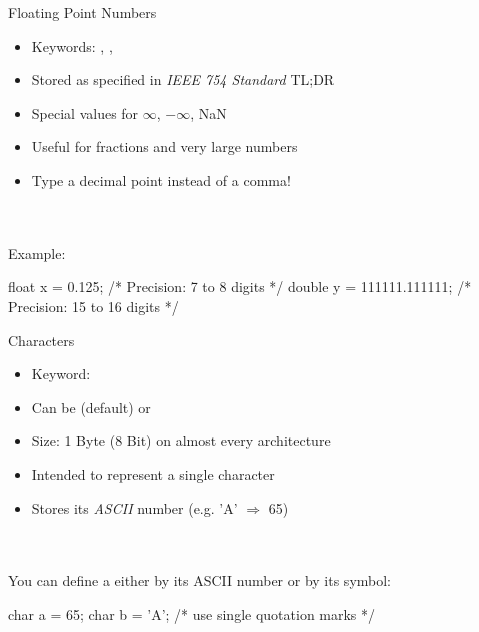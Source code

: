 \documentclass[10pt,graphics,aspectratio=169,table]{beamer}
\begin{document}
\begin{frame}[fragile]{Floating Point Numbers}
    \begin{itemize}
        \item Keywords: , , 
        \item Stored as specified in \textit{IEEE 754 Standard} TL;DR
        \item Special values for $\infty$, $-\infty$, NaN
        \item Useful for fractions and very large numbers
        \item Type a decimal point instead of a comma!
    \end{itemize}\ \\
    \ \\
    Example:
    \begin{codeblock}
float x = 0.125;             /* Precision: 7 to 8 digits */
double y = 111111.111111;    /* Precision: 15 to 16 digits */
    \end{codeblock}
\end{frame}
\begin{frame}[fragile]{Characters}
    \begin{itemize}
        \item Keyword: 
        \item Can be (default) or 
        \item Size: 1 Byte (8 Bit) on almost every architecture
        \item Intended to represent a single character
        \item Stores its \textit{ASCII} number (e.g. 'A' $\Rightarrow$ 65)
    \end{itemize}\ \\
    \ \\
    You can define a  either by its ASCII number or by its symbol:
    \begin{codeblock}
char a = 65;
char b = 'A';    /* use single quotation marks */
    \end{codeblock}
\end{frame}
\end{document}
